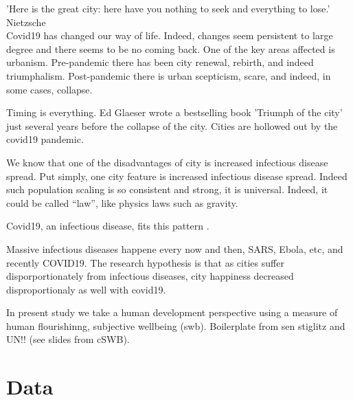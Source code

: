 \documentclass[10pt, letterpaper]{article}
\begin{document}
\begin{spacing}{1.4}

'Here is the great city: here have you nothing to seek and everything to lose.' Nietzsche\\


Covid19 has changed our way of life. Indeed, changes seem persistent
  to large degree and there seems to be no coming back. One of the key areas
  affected is urbanism. Pre-pandemic there has been city renewal, rebirth, and indeed
  triumphalism. Post-pandemic there is urban scepticism, scare, and indeed, in
  some cases, collapse.


Timing is everything. Ed Glaeser wrote a bestselling book 'Triumph of the city'
just several years before the collapse of the city. Cities are hollowed out by
the covid19 pandemic.


We know that one of the disadvantages of city is increased infectious disease
spread. Put simply, one city feature is increased
infectious disease spread. Indeed such population scaling is so consistent and
strong, it is universal\citep{blissCL_nov4_14,bettencourt10,bettencourt10b,bettencourt07}. Indeed, it could be called ``law'', like physics laws such as gravity.

Covid19, an infectious disease, fits this pattern  \citep{stier2021early}. 

Massive infectious diseases happene every now and then, SARS, Ebola, etc, and recently COVID19. The
research hypothesis is that as cities suffer disporportionately from infectious
diseases, city happiness decreased disproportionaly as well with covid19.



  In present study we take a human development perspective using a measure of
  human flourishinng, subjective wellbeing (swb).
  Boilerplate from sen stiglitz and UN!! (see slides from cSWB).

  
\section{Data}


\end{spacing}
\end{document}
